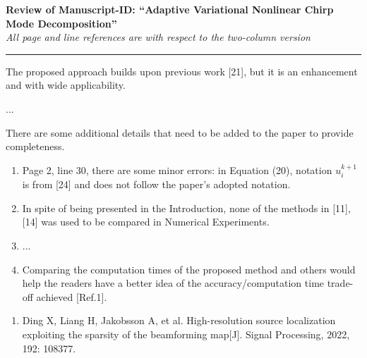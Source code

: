 \documentclass[11pt]{article}
\begin{document}
	
\begin{center} 
	{\Large \bf  Review of Manuscript-ID: “Adaptive Variational Nonlinear Chirp Mode Decomposition”}\\ 
	{\it  All page and line references are with respect to the two-column version} \\ 
\end{center}
\hrule height 0.5pt\hfill


The proposed approach builds upon previous work [21], but it is an enhancement and with wide applicability. 

...

There are some additional details that need to be added to the paper to provide completeness.

\begin{enumerate}

\item Page 2, line 30, there are some minor errors: in Equation (20), notation $u_i^{k+1}$ is from [24] and does not follow the paper's adopted notation.


\item In spite of being presented in the Introduction, none of the methods in [11], [14] was used to be compared in Numerical Experiments. 

\item ...

\item Comparing the computation times of the proposed method and others would help the readers have a better idea of the accuracy/computation time trade-off achieved [Ref.1]. \\
	
\end{enumerate}


{\large \bf {}}
\begin{enumerate}

\item Ding X, Liang H, Jakobsson A, et al. High-resolution source localization exploiting the sparsity of the beamforming map[J]. Signal Processing, 2022, 192: 108377.


\end{enumerate}
	
\end{document}
